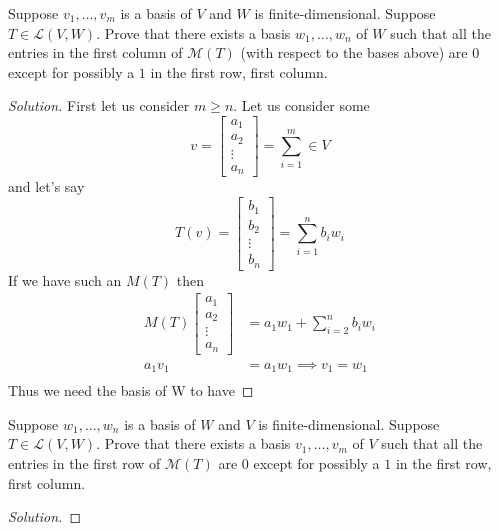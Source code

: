 \documentclass{article}
\newcommand{\LL}{\mathcal L}
\newcommand{\M}{\mathcal M}
\newenvironment{problem}[2][Problem]{\begin{trivlist}
\item[\hskip \labelsep {\bfseries #1}\hskip \labelsep {\bfseries #2.}]}{\end{trivlist}}
\newenvironment{solution}
  {\renewcommand{\qedsymbol}{}\begin{proof}[Solution]}
  {\end{proof}}
\begin{document}
\newpage
\begin{problem}{4} Suppose $v_1,\ldots,v_m$ is a basis of $V$ and $W$ is finite-dimensional. Suppose $T\in\LL(V,W)$. Prove that there exists a basis $w_1,\ldots,w_n$ of $W$ such that all the entries in the first column of $\M(T)$ (with respect to the bases above) are $0$ except for possibly a $1$ in the first row, first column.
\end{problem}
\begin{solution}
  First let us consider $m\geq n$. Let us consider some \[v=\begin{bmatrix}a_1\\a_2\\ \vdots \\a_{n}\end{bmatrix}=\sum_{i=1}^m\in V\]
  and let's say
  \[T(v)=\begin{bmatrix}b_1\\b_2\\ \vdots \\b_{n}\end{bmatrix}=\sum_{i=1}^nb_iw_i\]
  If we have such an $M(T)$ then
  \begin{align*}
    M(T)\begin{bmatrix}a_1\\a_2\\ \vdots \\a_{n}\end{bmatrix}&=a_1w_1+\sum_{i=2}^nb_iw_i\\
    a_1v_1&=a_1w_1\implies v_1=w_1\\
  \end{align*}
  Thus we need the basis of W to have
\end{solution}
\newpage
\begin{problem}{5}
Suppose $w_1,\ldots,w_n$ is a basis of $W$ and $V$ is finite-dimensional. Suppose $T\in\LL(V,W)$. Prove that there exists a basis $v_1,\ldots,v_m$ of $V$ such that all the entries in the first row of $\M(T)$ are $0$ except for possibly a $1$ in the first row, first column.
\end{problem}
\begin{solution}
\end{solution}
\newpage
\end{document}
